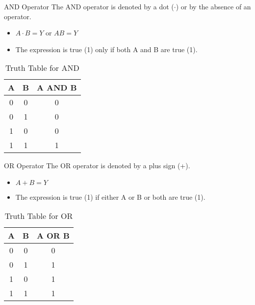 \documentclass{beamer}
\begin{document}
\begin{frame}{AND Operator}
    The AND operator is denoted by a dot ($\cdot$) or by the absence of an operator.
    \begin{itemize}
        \item $A \cdot B = Y$ or $AB = Y$
        \item The expression is true (1) only if both A and B are true (1).
    \end{itemize}
    \begin{table}
        \centering
        \begin{tabular}{|c|c|c|}
            \hline
            \textbf{A} & \textbf{B} & \textbf{A AND B} \\
            \hline
            0 & 0 & 0 \\
            0 & 1 & 0 \\
            1 & 0 & 0 \\
            1 & 1 & 1 \\
            \hline
        \end{tabular}
        \caption{Truth Table for AND}
    \end{table}
\end{frame}

\begin{frame}{OR Operator}
    The OR operator is denoted by a plus sign (+).
    \begin{itemize}
        \item $A + B = Y$
        \item The expression is true (1) if either A or B or both are true (1).
    \end{itemize}
    \begin{table}
        \centering
        \begin{tabular}{|c|c|c|}
            \hline
            \textbf{A} & \textbf{B} & \textbf{A OR B} \\
            \hline
            0 & 0 & 0 \\
            0 & 1 & 1 \\
            1 & 0 & 1 \\
            1 & 1 & 1 \\
            \hline
        \end{tabular}
        \caption{Truth Table for OR}
    \end{table}
\end{frame}
\end{document}
